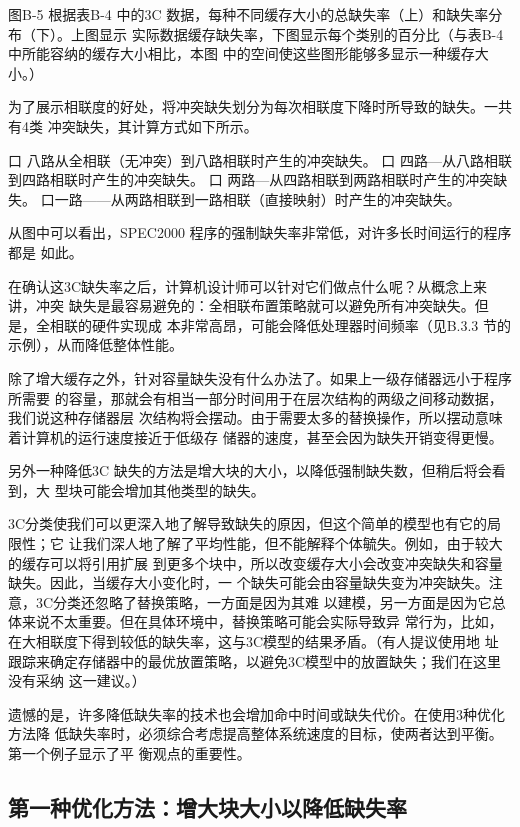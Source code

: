 图B-5 根据表B-4 中的3C 数据，每种不同缓存大小的总缺失率（上）和缺失率分布（下）。上图显示
实际数据缓存缺失率，下图显示每个类别的百分比（与表B-4 中所能容纳的缓存大小相比，本图
中的空间使这些图形能够多显示一种缓存大小。）

为了展示相联度的好处，将冲突缺失划分为每次相联度下降时所导致的缺失。一共有4类
冲突缺失，其计算方式如下所示。

口 八路从全相联（无冲突）到八路相联时产生的冲突缺失。
口 四路—从八路相联到四路相联时产生的冲突缺失。
口 两路—从四路相联到两路相联时产生的冲突缺失。
口一路——从两路相联到一路相联（直接映射）时产生的冲突缺失。

从图中可以看出，SPEC2000 程序的强制缺失率非常低，对许多长时间运行的程序都是
如此。

在确认这3C缺失率之后，计算机设计师可以针对它们做点什么呢？从概念上来讲，冲突
缺失是最容易避免的：全相联布置策略就可以避免所有冲突缺失。但是，全相联的硬件实现成
本非常高昂，可能会降低处理器时间频率（见B.3.3 节的示例），从而降低整体性能。

除了增大缓存之外，针对容量缺失没有什么办法了。如果上一级存储器远小于程序所需要
的容量，那就会有相当一部分时间用于在层次结构的两级之间移动数据，我们说这种存储器层
次结构将会摆动。由于需要太多的替换操作，所以摆动意味着计算机的运行速度接近于低级存
储器的速度，甚至会因为缺失开销变得更慢。

另外一种降低3C 缺失的方法是增大块的大小，以降低强制缺失数，但稍后将会看到，大
型块可能会增加其他类型的缺失。

3C分类使我们可以更深入地了解导致缺失的原因，但这个简单的模型也有它的局限性；它
让我们深人地了解了平均性能，但不能解释个体毓失。例如，由于较大的缓存可以将引用扩展
到更多个块中，所以改变缓存大小会改变冲突缺失和容量缺失。因此，当缓存大小变化时，一
个缺失可能会由容量缺失变为冲突缺失。注意，3C分类还忽略了替换策略，一方面是因为其难
以建模，另一方面是因为它总体来说不太重要。但在具体环境中，替换策略可能会实际导致异
常行为，比如，在大相联度下得到较低的缺失率，这与3C模型的结果矛盾。（有人提议使用地
址跟踪来确定存储器中的最优放置策略，以避免3C模型中的放置缺失；我们在这里没有采纳
这一建议。）

遗憾的是，许多降低缺失率的技术也会增加命中时间或缺失代价。在使用3种优化方法降
低缺失率时，必须综合考虑提高整体系统速度的目标，使两者达到平衡。第一个例子显示了平
衡观点的重要性。

\subsection{第一种优化方法：增大块大小以降低缺失率}

